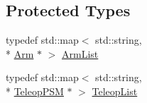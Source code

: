 \subsection*{Protected Types}
\begin{DoxyCompactItemize}
\item 
typedef std\-::map$<$ std\-::string, \\*
\hyperlink{classmts_intuitive_research_kit_console_1_1_arm}{Arm} $\ast$ $>$ \hyperlink{classmts_intuitive_research_kit_console_a73791e1c46d037b4eff9e89a5a7115dc}{Arm\-List}
\item 
typedef std\-::map$<$ std\-::string, \\*
\hyperlink{classmts_intuitive_research_kit_console_1_1_teleop_p_s_m}{Teleop\-P\-S\-M} $\ast$ $>$ \hyperlink{classmts_intuitive_research_kit_console_ac8742419cdc8c2eaa6889dcf81d08cc5}{Teleop\-List}
\end{DoxyCompactItemize}
